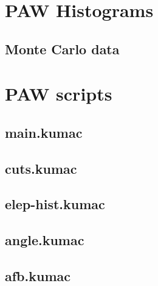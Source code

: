 \documentclass[11pt, english, fleqn, DIV=15, headinclude, BCOR=2cm]{scrreprt}
\begin{document}
\begin{appendix}

    \chapter{PAW Histograms}

    \section{Monte Carlo data}

    

    

    
    
    

    \chapter{PAW scripts}

    \section{main.kumac}
    \label{main.kumac}

    

    \section{cuts.kumac}
    \label{cuts.kumac}

    

    \section{elep-hist.kumac}
    \label{elep-hist.kumac}

    

    \section{angle.kumac}
    \label{angle.kumac}

    

    \section{afb.kumac}
    \label{afb.kumac}


\end{appendix}
\end{document}
